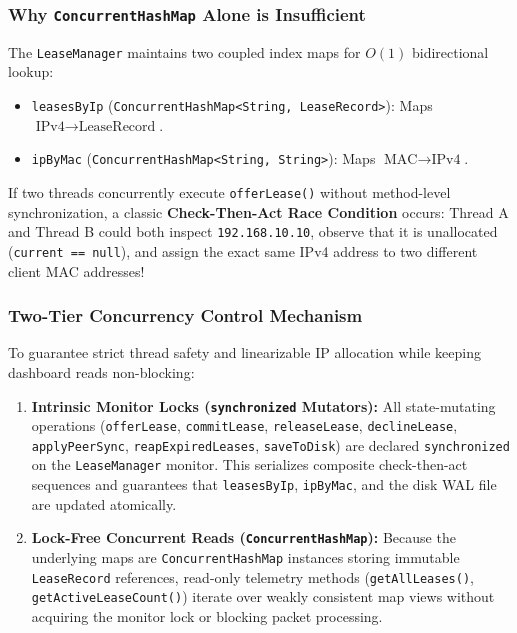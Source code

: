 \documentclass[11pt,a4paper]{article}
\begin{document}
\subsubsection{Why \texttt{ConcurrentHashMap} Alone is Insufficient}
The \texttt{LeaseManager} maintains two coupled index maps for $O(1)$ bidirectional lookup:
\begin{itemize}[leftmargin=2em]
    \item \texttt{leasesByIp} (\texttt{ConcurrentHashMap<String, LeaseRecord>}): Maps $\text{IPv4} \rightarrow \text{LeaseRecord}$.
    \item \texttt{ipByMac} (\texttt{ConcurrentHashMap<String, String>}): Maps $\text{MAC} \rightarrow \text{IPv4}$.
\end{itemize}
If two threads concurrently execute \texttt{offerLease()} without method-level synchronization, a classic \textbf{Check-Then-Act Race Condition} occurs: Thread A and Thread B could both inspect \texttt{192.168.10.10}, observe that it is unallocated (\texttt{current == null}), and assign the exact same IPv4 address to two different client MAC addresses!

\subsubsection{Two-Tier Concurrency Control Mechanism}
To guarantee strict thread safety and linearizable IP allocation while keeping dashboard reads non-blocking:
\begin{enumerate}[leftmargin=2em]
    \item \textbf{Intrinsic Monitor Locks (\texttt{synchronized} Mutators):} All state-mutating operations (\texttt{offerLease}, \texttt{commitLease}, \texttt{releaseLease}, \texttt{declineLease}, \texttt{applyPeerSync}, \texttt{reapExpiredLeases}, \texttt{saveToDisk}) are declared \texttt{synchronized} on the \texttt{LeaseManager} monitor. This serializes composite check-then-act sequences and guarantees that \texttt{leasesByIp}, \texttt{ipByMac}, and the disk WAL file are updated atomically.
    \item \textbf{Lock-Free Concurrent Reads (\texttt{ConcurrentHashMap}):} Because the underlying maps are \texttt{ConcurrentHashMap} instances storing immutable \texttt{LeaseRecord} references, read-only telemetry methods (\texttt{getAllLeases()}, \texttt{getActiveLeaseCount()}) iterate over weakly consistent map views without acquiring the monitor lock or blocking packet processing.
\end{enumerate}
\end{document}
